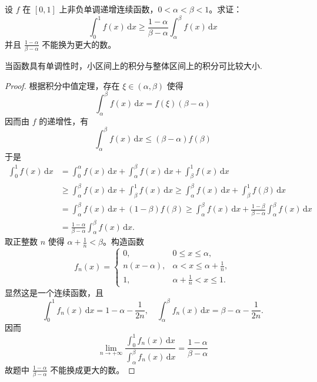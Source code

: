\documentclass[../../main.tex]{subfiles}
\begin{document}
\begin{example}
设 \( f \) 在 \([0,1]\) 上非负单调递增连续函数，\( 0 < \alpha < \beta < 1 \)。求证：
\[
\int_{0}^{1} f(x) \, \mathrm{d}x \geqslant \frac{1 - \alpha}{\beta - \alpha} \int_{\alpha}^{\beta} f(x) \, \mathrm{d}x
\]
并且 \( \frac{1 - \alpha}{\beta - \alpha} \) 不能换为更大的数。
\end{example}
\begin{remark}
当函数具有单调性时，小区间上的积分与整体区间上的积分可比较大小.
\end{remark}
\begin{proof}
根据积分中值定理，存在 \( \xi \in (\alpha, \beta) \) 使得
\[
\int_{\alpha}^{\beta} f(x) \, \mathrm{d}x = f(\xi)(\beta - \alpha)
\]
因而由 \( f \) 的递增性，有
\[
\int_{\alpha}^{\beta} f(x) \, \mathrm{d}x \leqslant (\beta - \alpha)f(\beta)
\]
于是
\begin{align*}
\int_{0}^{1} f(x) \, \mathrm{d}x &= \int_{0}^{\alpha} f(x) \, \mathrm{d}x + \int_{\alpha}^{\beta} f(x) \, \mathrm{d}x + \int_{\beta}^{1} f(x) \, \mathrm{d}x \\
&\geqslant \int_{\alpha}^{\beta} f(x) \, \mathrm{d}x + \int_{\beta}^{1} f(x) \, \mathrm{d}x \geqslant \int_{\alpha}^{\beta} f(x) \, \mathrm{d}x + \int_{\beta}^{1} f(\beta) \, \mathrm{d}x \\
&= \int_{\alpha}^{\beta} f(x) \, \mathrm{d}x + (1 - \beta)f(\beta) \geqslant \int_{\alpha}^{\beta} f(x) \, \mathrm{d}x + \frac{1 - \beta}{\beta - \alpha} \int_{\alpha}^{\beta} f(x) \, \mathrm{d}x \\
&= \frac{1 - \alpha}{\beta - \alpha} \int_{\alpha}^{\beta} f(x) \, \mathrm{d}x.
\end{align*}
取正整数 \( n \) 使得 \( \alpha + \frac{1}{n} < \beta \)。构造函数
\[
f_n(x) = \begin{cases} 
0, & 0 \leqslant x \leqslant \alpha, \\
n(x - \alpha), & \alpha < x \leqslant \alpha + \frac{1}{n}, \\
1, & \alpha + \frac{1}{n} < x \leqslant 1 .
\end{cases}
\]
显然这是一个连续函数，且
\[
\int_{0}^{1} f_n(x) \, \mathrm{d}x = 1 - \alpha - \frac{1}{2n}, \quad \int_{\alpha}^{\beta} f_n(x) \, \mathrm{d}x = \beta - \alpha - \frac{1}{2n}.
\]
因而
\[
\lim_{n \to +\infty} \frac{\int_{0}^{1} f_n(x) \, \mathrm{d}x}{\int_{\alpha}^{\beta} f_n(x) \, \mathrm{d}x} = \frac{1 - \alpha}{\beta - \alpha}
\]
故题中 \( \frac{1 - \alpha}{\beta - \alpha} \) 不能换成更大的数。
\end{proof}
\end{document}
